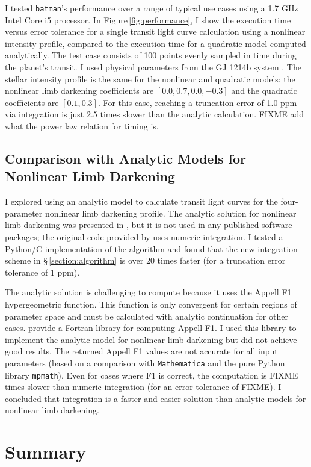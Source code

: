 \documentclass[12pt,preprint]{aastex}
\begin{document}
I tested \texttt{batman}'s performance over a range of typical use cases using a 1.7 GHz Intel Core i5 processor.  In Figure\,\ref{fig:performance}, I show the execution time versus error tolerance for a single transit light curve calculation using a nonlinear intensity profile, compared to the execution time for a quadratic model computed analytically.  The test case consists of 100 points evenly sampled in time during the planet's transit. I used physical parameters from the GJ 1214b system \citep{kreidberg14a}. The stellar intensity profile is the same for the nonlinear and quadratic models: the nonlinear limb darkening coefficients are $[0.0, 0.7, 0.0, -0.3]$ and the quadratic coefficients are $[0.1, 0.3]$.  For this case, reaching a truncation error of 1.0 ppm via integration is just 2.5 times slower than the analytic calculation. FIXME add what the power law relation for timing is.

\subsection{Comparison with Analytic Models for Nonlinear Limb Darkening}
I explored using an analytic model to calculate transit light curves for the four-parameter nonlinear limb darkening profile.  The analytic solution for nonlinear limb darkening was presented in \cite{mandel02}, but it is not used in any published software packages; the original code provided by \cite{mandel02} uses numeric integration.   I tested a Python/C implementation of the \cite{mandel02} algorithm and found that the new integration scheme in \S\,\ref{section:algorithm} is over 20 times faster (for a truncation error tolerance of 1 ppm).

The analytic solution is challenging to compute because it uses the Appell F1 hypergeometric function.  This function is only convergent for certain regions of parameter space and must be calculated with analytic continuation for other cases. \cite{colavecchia04} provide a Fortran library for computing Appell F1.  I used this library to implement the analytic model for nonlinear limb darkening but did not achieve good results. The returned Appell F1 values are not accurate for all input parameters (based on a comparison with \texttt{Mathematica} and the pure Python library \texttt{mpmath}).  Even for cases where F1 is correct, the computation is FIXME times slower than numeric integration (for an error tolerance of FIXME).  I concluded that integration is a faster and easier solution than analytic models for nonlinear limb darkening.

\section{Summary}

\acknowledgments



\end{document}
